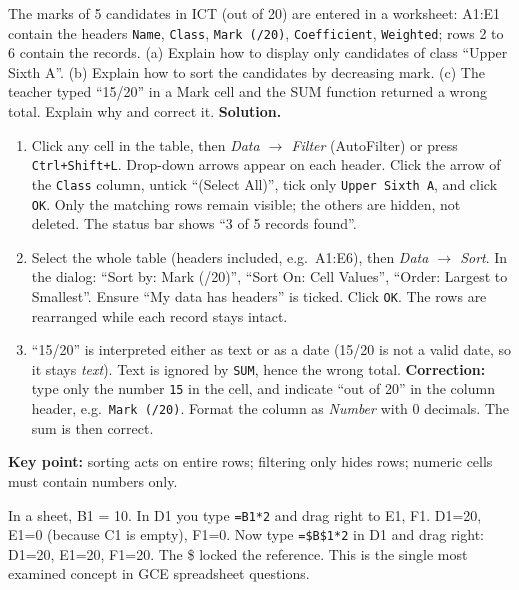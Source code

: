 \documentclass[11pt]{article}
\newcounter{popsec}
\newcounter{popsub}
\newcommand{\courssub}[1]{%
  \stepcounter{popsub}%
  \par\vspace{9pt}\noindent{\popxbold\fontsize{11.5}{13}\selectfont\color{popink}{\color{poporange}\thepopsec.\thepopsub}\hspace{6pt}#1}\par\nopagebreak\vspace{4pt}
}
\begin{document}
\begin{exoresolu}
The marks of 5 candidates in ICT (out of 20) are entered in a worksheet: A1:E1 contain the headers \texttt{Name}, \texttt{Class}, \texttt{Mark (/20)}, \texttt{Coefficient}, \texttt{Weighted}; rows 2 to 6 contain the records. (a) Explain how to display only candidates of class ``Upper Sixth A''. (b) Explain how to sort the candidates by decreasing mark. (c) The teacher typed ``15/20'' in a Mark cell and the SUM function returned a wrong total. Explain why and correct it.
\tcblower
\textbf{Solution.}
\begin{enumerate}
\item[(a)] Click any cell in the table, then \emph{Data $\rightarrow$ Filter} (AutoFilter) or press \texttt{Ctrl+Shift+L}. Drop-down arrows appear on each header. Click the arrow of the \texttt{Class} column, untick ``(Select All)'', tick only \texttt{Upper Sixth A}, and click \texttt{OK}. Only the matching rows remain visible; the others are hidden, not deleted. The status bar shows ``3 of 5 records found''.
\item[(b)] Select the whole table (headers included, e.g.\ A1:E6), then \emph{Data $\rightarrow$ Sort}. In the dialog: ``Sort by: Mark (/20)'', ``Sort On: Cell Values'', ``Order: Largest to Smallest''. Ensure ``My data has headers'' is ticked. Click \texttt{OK}. The rows are rearranged while each record stays intact.
\item[(c)] ``15/20'' is interpreted either as text or as a date (15/20 is not a valid date, so it stays \emph{text}). Text is ignored by \texttt{SUM}, hence the wrong total. \textbf{Correction:} type only the number \texttt{15} in the cell, and indicate ``out of 20'' in the column header, e.g.\ \texttt{Mark (/20)}. Format the column as \emph{Number} with 0 decimals. The sum is then correct.
\end{enumerate}
\textbf{Key point:} sorting acts on entire rows; filtering only hides rows; numeric cells must contain numbers only.
\end{exoresolu}

\courssub{Cell Referencing and Basic Formulae}

\begin{experience}
In a sheet, B1 = 10. In D1 you type \texttt{=B1*2} and drag right to E1, F1. D1=20, E1=0 (because C1 is empty), F1=0. Now type \texttt{=\$B\$1*2} in D1 and drag right: D1=20, E1=20, F1=20. The \$ locked the reference. This is the single most examined concept in GCE spreadsheet questions.
\end{experience}
\end{document}
